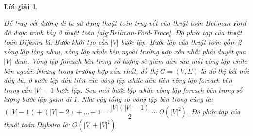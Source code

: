 \documentclass[14pt, a4paper]{article}
\theoremstyle{sltheorem}
\theoremstyle{soltheorem}
\newtheorem*{loigiai}{Lời giải}
\begin{document}
\begin{loigiai}
\begin{itemize}
\begin{itemize}
                Để truy vết đường đi ta sử dụng thuật toán truy vết của thuật toán Bellman-Ford đã được trình bày ở thuật toán \ref{alg:Bellman-Ford-Trace}.
                Độ phức tạp của thuật toán Dijkstra là: Bước khởi tạo cần $\lvert V \rvert$ bước lặp.
                Bước lặp của thuật toán gồm 2 vòng lặp lồng nhau, vòng lặp while bên ngoài trường hợp xấu nhất phải duyệt qua $\lvert V \rvert$ đỉnh.
                Vòng lặp foreach bên trong số lượng sẽ giảm dần sau mỗi vòng lặp while bên ngoài. Nhưng trong trường hợp xấu nhất, đồ thị $G=(V, E)$ là đồ thị kết nối đầy đủ,
                ở bước lặp đầu tiên của vòng lặp while đầu tiên vòng lặp foreach bên trong cần $\lvert V \rvert - 1$ bước lặp.
                Sau mỗi bước lặp while vòng lặp foreach bên trong số lượng bước lặp giảm đi 1.
                Như vậy tổng số vòng lặp bên trong cùng là: $(\lvert V \rvert - 1) + (\lvert V \rvert - 2) + \dots + 1=\dfrac{\lvert V \rvert(\lvert V \rvert - 1)}{2} \sim O(\lvert V \rvert^2)$.
                Độ phức tạp của thuật toán Dijkstra là: $O(\lvert V \rvert + \lvert V \rvert^2)$
            \end{itemize}
        \end{itemize}
    \end{loigiai}
    \newpage

    \printbibliography[title={TÀI LIỆU THAM KHẢO}]
\end{document}
